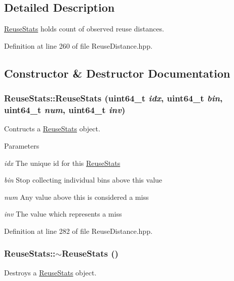 \subsection{Detailed Description}
\hyperlink{class_reuse_stats}{ReuseStats} holds count of observed reuse distances. 

Definition at line 260 of file ReuseDistance.hpp.



\subsection{Constructor \& Destructor Documentation}
\hypertarget{class_reuse_stats_a8e2f08c38fb9d1df602c97832d796f3b}{
\subsubsection[{ReuseStats}]{\setlength{\rightskip}{0pt plus 5cm}ReuseStats::ReuseStats (uint64\_\-t {\em idx}, \/  uint64\_\-t {\em bin}, \/  uint64\_\-t {\em num}, \/  uint64\_\-t {\em inv})}}
\label{class_reuse_stats_a8e2f08c38fb9d1df602c97832d796f3b}
Contructs a \hyperlink{class_reuse_stats}{ReuseStats} object.


\begin{DoxyParams}{Parameters}
\item[{\em idx}]The unique id for this \hyperlink{class_reuse_stats}{ReuseStats} \item[{\em bin}]Stop collecting individual bins above this value \item[{\em num}]Any value above this is considered a miss \item[{\em inv}]The value which represents a miss \end{DoxyParams}


Definition at line 282 of file ReuseDistance.hpp.

\hypertarget{class_reuse_stats_a21f8a5cab3976edba08c2562c3ed8d45}{
\subsubsection[{$\sim$ReuseStats}]{\setlength{\rightskip}{0pt plus 5cm}ReuseStats::$\sim$ReuseStats ()}}
\label{class_reuse_stats_a21f8a5cab3976edba08c2562c3ed8d45}
Destroys a \hyperlink{class_reuse_stats}{ReuseStats} object. 

